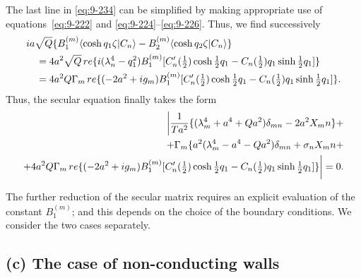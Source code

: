 The last line in \eqref{eq:9-234} can be simplified by making appropriate use of equations~\eqref{eq:9-222} and \eqref{eq:9-224}--\eqref{eq:9-226}. Thus, we find successively
\begin{align}
&ia\sqrt{Q}\{B_1^{(m)}\langle\cosh q_1\zeta|C_n\rangle - B_2^{(m)}\langle\cosh q_2\zeta|C_n\rangle\} \notag \\
&\quad = 4a^2\sqrt{Q}\,\mathrm{re}\{i(\lambda_n^4 - q_1^2)B_1^{(m)}[C_n'(\tfrac{1}{2})\cosh\tfrac{1}{2}q_1 - C_n(\tfrac{1}{2})q_1\sinh\tfrac{1}{2}q_1]\} \notag \\
&\quad = 4a^2 Q\Gamma_m\,\mathrm{re}\{(-2a^2 + ig_m)B_1^{(m)}[C_n'(\tfrac{1}{2})\cosh\tfrac{1}{2}q_1 - C_n(\tfrac{1}{2})q_1\sinh\tfrac{1}{2}q_1]\}. \label{eq:9-238}
\end{align}
Thus, the secular equation finally takes the form
\begin{align}
\bigg|\frac{1}{\mathscr{T} a^2}\{(\lambda_m^4 + a^4 + Qa^2)\delta_{mn} - 2a^2 X_\mathrm{mn}\} + \notag \\
+ \Gamma_m\{a^2(\lambda_m^4 - a^4 - Qa^2)\delta_{mn} + \sigma_n X_\mathrm{mn} + \notag \\
+ 4a^2 Q\Gamma_m\,\mathrm{re}\{(-2a^2 + ig_m)B_1^{(m)}[C_n'(\tfrac{1}{2})\cosh\tfrac{1}{2}q_1 - C_n(\tfrac{1}{2})q_1\sinh\tfrac{1}{2}q_1]\}\bigg| = 0. \label{eq:9-239}
\end{align}

The further reduction of the secular matrix requires an explicit evaluation of the constant $B_1^{(m)}$; and this depends on the choice of the boundary conditions. We consider the two cases separately.

\subsection*{(c) The case of non-conducting walls}

